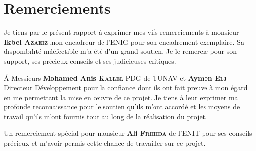 
\chapter*{Remerciements}

Je tiens par le présent rapport à exprimer mes vifs remerciements à monsieur \textbf{Ikbel \textsc{Azaeiz}} mon encadreur de l'ENIG pour son encadrement exemplaire. Sa disponibilité indéfectible m'a été d'un grand soutien. Je le remercie pour son support, ses précieux conseils et ses judicieuses critiques.

 Á Messieurs \textbf{Mohamed Anis \textsc{Kallel}} PDG de TUNAV et \textbf{Aymen \textsc{Elj}} Directeur Développement pour la confiance dont ils ont fait preuve à mon égard en me permettant la mise en œuvre de ce projet. Je tiens à leur exprimer ma profonde reconnaissance pour le soutien qu'ils m'ont accordé et les moyens de travail qu'ils m'ont fournis tout au long de la réalisation du projet.

Un remerciement spécial pour monsieur \textbf{Ali \textsc{Frihida}} de l'ENIT pour ses conseils précieux et m'avoir permis cette chance de travailler sur ce projet.